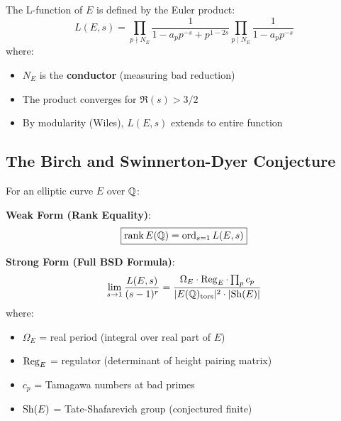 \begin{defn}\label{def:l-function-elliptic}
The L-function of $E$ is defined by the Euler product\cite{silverman1986arithmetic}:
\begin{equation}
L(E,s) = \prod_{p \nmid N_E} \frac{1}{1 - a_p p^{-s} + p^{1-2s}} \prod_{p \mid N_E} \frac{1}{1 - a_p p^{-s}}
\end{equation}
where:
\begin{itemize}
\item $N_E$ is the \textbf{conductor} (measuring bad reduction)
\item The product converges for $\Re(s) > 3/2$
\item By modularity (Wiles\cite{wiles1995modular}), $L(E,s)$ extends to entire function
\end{itemize}
\end{defn}

\subsection{The Birch and Swinnerton-Dyer Conjecture}

\begin{conjecture}\label{conj:bsd}
For an elliptic curve $E$ over $\mathbb{Q}$:

\textbf{Weak Form (Rank Equality)}:
\begin{equation}
\boxed{\operatorname{rank} E(\mathbb{Q}) = \operatorname{ord}_{s=1} L(E,s)}
\end{equation}

\textbf{Strong Form (Full BSD Formula)}:
\begin{equation}
\lim_{s \to 1} \frac{L(E,s)}{(s-1)^r} = \frac{\Omega_E \cdot \operatorname{Reg}_E \cdot \prod_p c_p}{|E(\mathbb{Q})_{\text{tors}}|^2 \cdot |\mathrm{Sh}(E)|}
\end{equation}
where:
\begin{itemize}
\item $\Omega_E$ = real period (integral over real part of $E$)
\item $\operatorname{Reg}_E$ = regulator (determinant of height pairing matrix)
\item $c_p$ = Tamagawa numbers at bad primes
\item $\mathrm{Sh}(E)$ = Tate-Shafarevich group (conjectured finite)
\end{itemize}
\end{conjecture}

